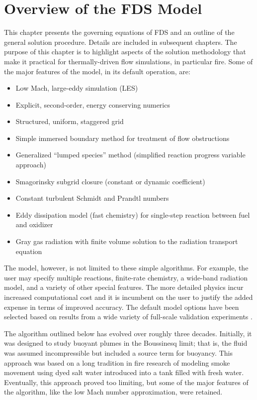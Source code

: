 \chapter{Overview of the FDS Model}

\label{basisformodel}

This chapter presents the governing equations of FDS and an outline of the general solution procedure. Details are included in subsequent chapters. The purpose of this chapter is to highlight aspects of the solution methodology that make it practical for thermally-driven flow simulations, in particular fire. Some of the major features of the model, in its default operation, are:
\begin{itemize}
\item Low Mach, large-eddy simulation (LES)
\item Explicit, second-order, energy conserving numerics
\item Structured, uniform, staggered grid
\item Simple immersed boundary method for treatment of flow obstructions
\item Generalized ``lumped species'' method (simplified reaction progress variable approach)
\item Smagorinsky subgrid closure (constant or dynamic coefficient)
\item Constant turbulent Schmidt and Prandtl numbers
\item Eddy dissipation model (fast chemistry) for single-step reaction between fuel and oxidizer
\item Gray gas radiation with finite volume solution to the radiation transport equation
\end{itemize}

The model, however, is not limited to these simple algorithms. For example, the user may specify multiple reactions, finite-rate chemistry, a wide-band radiation model, and a variety of other special features. The more detailed physics incur increased computational cost and it is incumbent on the user to justify the added expense in terms of improved accuracy.  The default model options have been selected based on results from a wide variety of full-scale validation experiments \cite{FDS_Validation_Guide}.

The algorithm outlined below has evolved over roughly three decades. Initially, it was designed to study buoyant plumes in the
Boussinesq limit; that is, the fluid was assumed incompressible but included a source term for buoyancy. This approach was based
on a long tradition in fire research of modeling smoke movement using dyed salt water introduced into a tank filled with fresh
water. Eventually, this approach proved too limiting, but some of the major features of the algorithm, like the low
Mach number approximation, were retained.


